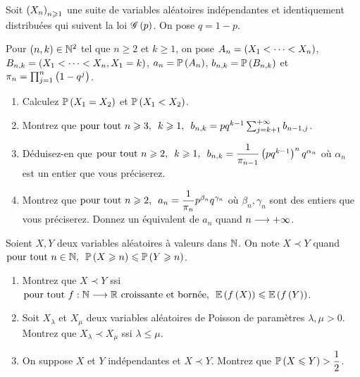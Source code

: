 \begin{exoss}
Soit \(\left(X_n\right)_{n\geqslant1}\) une suite de variables aléatoires indépendantes et identiquement distribuées qui suivent la loi \(\mathscr{G}\left(p\right)\). On pose \(q=1-p\).

Pour \(\left(n,k\right)\in\mathbb{N}^2\) tel que \(n\geq2\) et \(k\geq1\), on pose \(A_n=\left(X_1<\dots<X_n\right)\), \(B_{n,k}=\left(X_1<\dots<X_n,X_1=k\right)\), \(a_n=\mathbb{P}\left(A_n\right)\), \(b_{n,k}=\mathbb{P}\left(B_{n,k}\right)\) et \(\pi_n=\prod_{j=1}^n\left(1-q^j\right)\).

\begin{enumerate}
    \item Calculez \(\mathbb{P}\left(X_1=X_2\right)\) et \(\mathbb{P}\left(X_1<X_2\right)\). \\
    \item Montrez que \(\quantifs{\tpt n\geq3;k\geq1}b_{n,k}=pq^{k-1}\sum_{j=k+1}^{\pinf}b_{n-1,j}\). \\
    \item Déduisez-en que \(\quantifs{\tpt n\geq2;k\geq1}b_{n,k}=\dfrac{1}{\pi_{n-1}}\paren{pq^{k-1}}^nq^{\alpha_n}\) où \(\alpha_n\) est un entier que vous préciserez. \\
    \item Montrez que \(\quantifs{\tpt n\geq2}a_n=\dfrac{1}{\pi_n}p^{\beta_n}q^{\gamma_n}\) où \(\beta_n,\gamma_n\) sont des entiers que vous préciserez. Donnez un équivalent de \(a_n\) quand \(n\longrightarrow+\infty\).
\end{enumerate}
\end{exoss}

\begin{exoss}
Soient \(X,Y\) deux variables aléatoires à valeurs dans \(\mathbb{N}\). On note \(X\prec Y\) quand \(\quantifs{\tpt n\in\N}\proba{X\geq n}\leq\proba{Y\geq n}\).

\begin{enumerate}
    \item Montrez que \(X\prec Y\) ssi \(\quantifs{\tpt f:\N\to\R\text{ croissante et bornée}}\esp{f\paren{X}}\leq\esp{f\paren{Y}}\). \\
    \item Soit \(X_\lambda\) et \(X_\mu\) deux variables aléatoires de Poisson de paramètres \(\lambda,\mu>0\). Montrez que \(X_\lambda\prec X_\mu\) ssi \(\lambda\leq\mu\). \\
    \item On suppose \(X\) et \(Y\) indépendantes et \(X\prec Y\). Montrez que \(\mathbb{P}\left(X\leqslant Y\right)>\dfrac{1}{2}\).
\end{enumerate}
\end{exoss}

